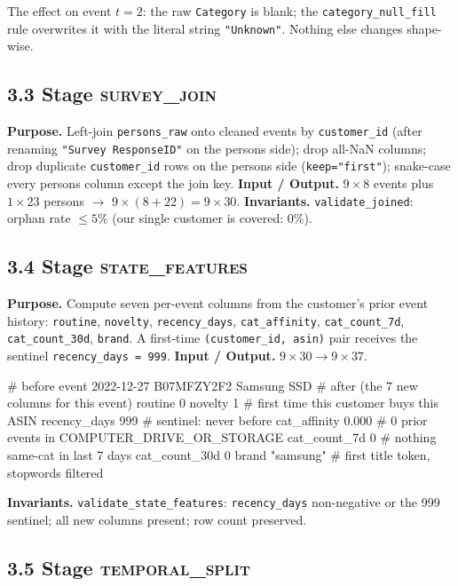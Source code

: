 \documentclass[11pt,a4paper]{article}
\begin{document}
The effect on event $t = 2$: the raw \texttt{Category} is blank; the
\texttt{category\_null\_fill} rule overwrites it with the literal
string \verb|"Unknown"|. Nothing else changes shape-wise.

\subsection*{3.3 Stage \textsc{survey\_join}}

\textbf{Purpose.} Left-join \texttt{persons\_raw} onto cleaned events
by \texttt{customer\_id} (after renaming \texttt{"Survey ResponseID"}
on the persons side); drop all-NaN columns; drop duplicate
\texttt{customer\_id} rows on the persons side
(\texttt{keep="first"}); snake-case every persons column except the
join key.
\textbf{Input / Output.} $9 \times 8$ events plus $1 \times 23$ persons
$\to$ $9 \times (8 + 22) = 9 \times 30$.
\textbf{Invariants.} \texttt{validate\_joined}: orphan rate $\leq 5\%$
(our single customer is covered: $0\%$).

\subsection*{3.4 Stage \textsc{state\_features}}

\textbf{Purpose.} Compute seven per-event columns from the customer's
prior event history: \texttt{routine}, \texttt{novelty},
\texttt{recency\_days}, \texttt{cat\_affinity}, \texttt{cat\_count\_7d},
\texttt{cat\_count\_30d}, \texttt{brand}. A first-time
\texttt{(customer\_id, asin)} pair receives the sentinel
\texttt{recency\_days = 999}.
\textbf{Input / Output.} $9 \times 30 \to 9 \times 37$.

\begin{code}
# before
event 2022-12-27 B07MFZY2F2 Samsung SSD
# after (the 7 new columns for this event)
routine         0
novelty         1        # first time this customer buys this ASIN
recency_days  999        # sentinel: never before
cat_affinity    0.000    # 0 prior events in COMPUTER_DRIVE_OR_STORAGE
cat_count_7d    0        # nothing same-cat in last 7 days
cat_count_30d   0
brand         "samsung"  # first title token, stopwords filtered
\end{code}

\textbf{Invariants.} \texttt{validate\_state\_features}:
\texttt{recency\_days} non-negative or the 999 sentinel; all new
columns present; row count preserved.

\subsection*{3.5 Stage \textsc{temporal\_split}}
\end{document}
